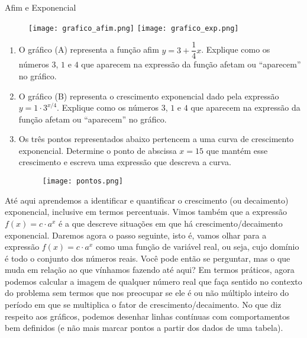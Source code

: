 \begin{task}{Afim e Exponencial}


\begin{figure}[H]
\centering
\texttt{[image: grafico\_afim.png]}\hspace{2em}
\texttt{[image: grafico\_exp.png]}
\end{figure}

\begin{enumerate}

\item{} O gráfico (A) representa a função afim $y=3+\dfrac{1}{4}x$. Explique como os números $3$, $1$ e $4$ que aparecem na expressão da função afetam ou “aparecem” no gráfico.

\item{} O gráfico (B) representa o crescimento exponencial dado pela expressão $y=1 \cdot 3^{x/4}$. Explique como os números $3$, $1$ e $4$ que aparecem na expressão da função afetam ou “aparecem” no gráfico.

\item{} Os três pontos representados abaixo pertencem a uma curva de crescimento exponencial. Determine o ponto de abscissa $x=15$ que mantém esse crescimento e escreva uma expressão que descreva a curva.

\begin{figure}[H]
\centering
\texttt{[image: pontos.png]}
\end{figure}

\end{enumerate}

\end{task}



Até aqui aprendemos a identificar e quantificar o crescimento (ou decaimento) exponencial, inclusive em termos percentuais. Vimos também que a expressão $f(x) = c \cdot a^{x}$ é a que descreve situações em que há crescimento/decaimento exponencial. Daremos agora o passo seguinte, isto é, vamos olhar para a expressão $f(x) = c \cdot a^{x}$ como uma função de variável real, ou seja, cujo domínio é todo o conjunto dos números reais. Você pode então se perguntar, mas o que muda em relação ao que vínhamos fazendo até aqui? Em termos práticos, agora podemos calcular a imagem de qualquer número real que faça sentido no contexto do problema sem termos que nos preocupar se ele é ou não múltiplo inteiro do período em que se multiplica o fator de crescimento/decaimento. No que diz respeito aos gráficos, podemos desenhar linhas contínuas com comportamentos bem definidos (e não mais marcar pontos a partir dos dados de uma tabela).

